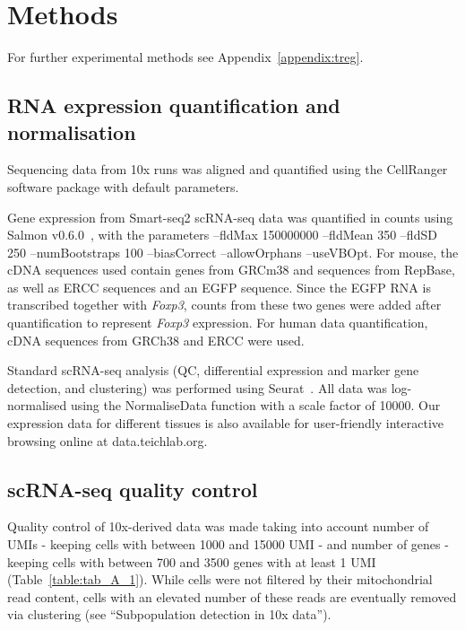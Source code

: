 
\section{Methods}
\label{section2.4}

For further experimental methods see Appendix~\ref{appendix:treg}.

\subsection{RNA expression quantification and normalisation}
Sequencing data from 10x runs was aligned and quantified using the CellRanger software package with default parameters.

Gene expression from Smart-seq2 scRNA-seq data was quantified in counts using Salmon v0.6.0~\citep{Patro2017-ce}, with the parameters --fldMax 150000000 --fldMean 350 --fldSD 250 --numBootstraps 100 --biasCorrect --allowOrphans --useVBOpt. For mouse, the cDNA sequences used contain genes from GRCm38 and sequences from RepBase, as well as ERCC sequences and an EGFP sequence. Since the EGFP RNA is transcribed together with \textit{Foxp3}, counts from these two genes were added after quantification to represent \textit{Foxp3} expression. For human data quantification, cDNA sequences from GRCh38 and ERCC were used.

Standard scRNA-seq analysis (QC, differential expression and marker gene detection, and clustering) was performed using Seurat~\citep{Satija2015-ti}. All data was log-normalised using the NormaliseData function with a scale factor of 10000. Our expression data for different tissues is also available for user-friendly interactive browsing online at data.teichlab.org.


\subsection{scRNA-seq quality control}
Quality control of 10x-derived data was made taking into account number of UMIs - keeping cells with between 1000 and 15000 UMI - and number of genes - keeping cells with between 700 and 3500 genes with at least 1 UMI (Table~\ref{table:tab_A_1}). While cells were not filtered by their mitochondrial read content, cells with an elevated number of these reads are eventually removed via clustering (see “Subpopulation detection in 10x data”).

